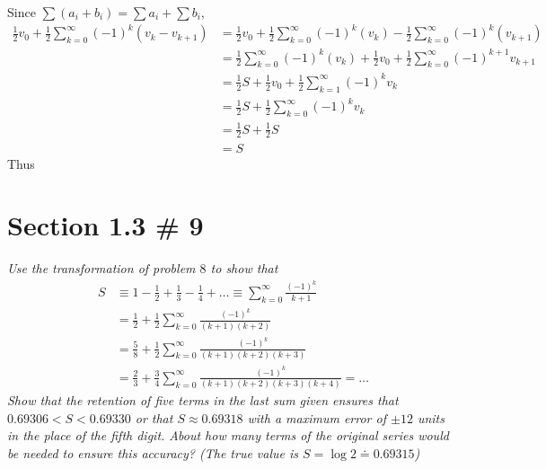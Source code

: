 \documentclass[12pt]{article}
\begin{document}
\noindent Since $\sum{(a_i + b_i)} = \sum{a_i} + \sum{b_i}$,
\begin{align*}
\tfrac{1}{2}v_0 + \tfrac{1}{2}\sum_{k=0}^\infty(-1)^k(v_k - v_{k+1}) &= \tfrac{1}{2}v_0 + \tfrac{1}{2}\sum_{k=0}^\infty(-1)^k(v_k) - \tfrac{1}{2}\sum_{k=0}^\infty(-1)^k(v_{k+1}) \\
&= \tfrac{1}{2}\sum_{k=0}^\infty(-1)^k(v_k) + \tfrac{1}{2}v_0 + \tfrac{1}{2}\sum_{k=0}^\infty(-1)^{k+1}v_{k+1} \\
&= \tfrac{1}{2}S + \tfrac{1}{2}v_0 + \tfrac{1}{2}\sum_{k=1}^{\infty}(-1)^kv_{k} \\
&= \tfrac{1}{2}S + \tfrac{1}{2}\sum_{k=0}^\infty(-1)^kv_k \\
&=\tfrac{1}{2}S + \tfrac{1}{2}S \\
&= S
\end{align*}
Thus 

\pagebreak
\section*{Section 1.3 \# 9}
{\it Use the transformation of problem $8$ to show that}
\begin{align*}
S &\equiv 1 - \tfrac{1}{2} + \tfrac{1}{3} - \tfrac{1}{4} + \dots \equiv \sum_{k=0}^\infty \frac{(-1)^k}{k+1} \\
&= \frac{1}{2} + \frac{1}{2}\sum_{k=0}^\infty \frac{(-1)^k}{(k+1)(k+2)} \\
&= \frac{5}{8} + \frac{1}{2}\sum_{k=0}^\infty \frac{(-1)^k}{(k+1)(k+2)(k+3)} \\
&= \frac{2}{3} + \frac{3}{4}\sum_{k=0}^\infty \frac{(-1)^k}{(k+1)(k+2)(k+3)(k+4)} = \dots
\end{align*}
{\it Show that the retention of five terms in the last sum given ensures that $0.69306 < S < 0.69330$ or that $S \approx 0.69318$ with a maximum error of $\pm 12$ units in the place of the fifth digit.  About how many terms of the original series would be needed to ensure this accuracy? (The true value is $S = \log{2} \doteq 0.69315$)} \\
\end{document}
